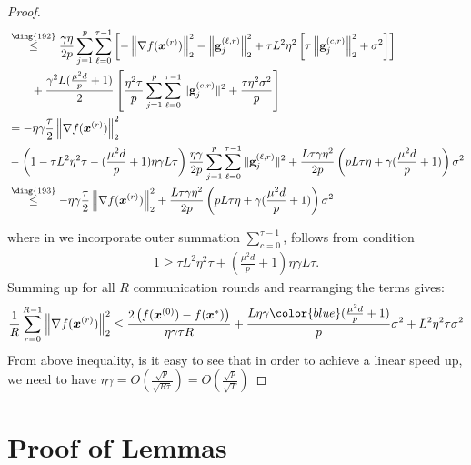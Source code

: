 \begin{proof}
\begin{align}
     &\stackrel{\text{\ding{192}}}{\leq}\frac{\gamma\eta}{2p}\sum_{j=1}^p\sum_{\ell=0}^{\tau-1}\left[-\left\|\nabla f({\boldsymbol{x}}^{(r)})\right\|_2^2-\left\|\mathbf{g}_j^{(\ell,r)}\right\|_2^2+\tau L^2\eta^2\left[\tau\left\|{\mathbf{g}}_j^{(c,r)}\right\|_2^2+\sigma^2\right]\right]\nonumber\\
     &\qquad+\frac{\gamma^2 L(\frac{\mu ^2d}{p}+1)}{2}\left[\frac{\eta^2\tau}{p}\sum_{j=1}^p\sum_{\ell=0}^{\tau-1}\|\mathbf{g}^{(c,r)}_{j}\|^2+\frac{\tau\eta^2 \sigma^2}{p}\right]\nonumber\\
     &=-\eta\gamma\frac{\tau}{2}\left\|\nabla f({\boldsymbol{x}}^{(r)})\right\|_2^2\nonumber\\
     &-\left(1-{\tau L^2\eta^2\tau}-{(\frac{\mu^2 d}{p}+1)\eta\gamma L}{\tau}\right)\frac{\eta\gamma}{2p}\sum_{j=1}^p\sum_{\ell=0}^{\tau-1}\|\mathbf{g}^{(\ell,r)}_{j}\|^2+\frac{L\tau\gamma\eta^2 }{2p}\left(pL\tau\eta+\gamma(\frac{\mu^2d}{p}+1)\right)\sigma^2\nonumber\\
     &\stackrel{\text{\ding{193}}}{\leq} -\eta\gamma\frac{\tau}{2}\left\|\nabla f({\boldsymbol{x}}^{(r)})\right\|_2^2+\frac{L\tau\gamma\eta^2 }{2p}\left(pL\tau\eta+\gamma(\frac{\mu^2d}{p}+1)\right)\sigma^2\label{eq:finalll}
\end{align}

where in  we incorporate outer summation $\sum_{c=0}^{\tau-1}$,  follows from condition 
\begin{align}
   1\geq {\tau L^2\eta^2\tau}+(\frac{\mu^2 d}{p}+1)\eta\gamma L{\tau}. 
\end{align}
Summing up for all $R$ communication rounds and  rearranging the terms gives:
\begin{align}
    \frac{1}{R}\sum_{r=0}^{R-1}\left\|\nabla f({\boldsymbol{x}}^{(r)})\right\|_2^2\leq \frac{2\left(f(\boldsymbol{x}^{(0)})-f(\boldsymbol{x}^{*})\right)}{\eta\gamma\tau R}+\frac{L\eta\gamma{\color{blue}(\frac{\mu^2 d}{p}+1)}}{p}\sigma^2+{L^2\eta^2\tau }\sigma^2
\end{align}
From above inequality, is it easy to see that in order to achieve a linear speed up, we need to have $\eta\gamma=O\left(\frac{\sqrt{p}}{\sqrt{R \tau}}\right)=O\left(\frac{\sqrt{p}}{\sqrt{T}}\right)$

\end{proof}
\section{Proof of Lemmas}
